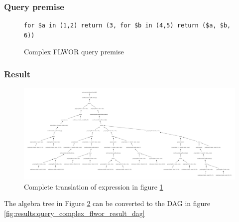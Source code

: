 \subsubsection{Query premise}
\begin{figure}[!htp]
\begin{center}
\begin{Verbatim}
for $a in (1,2) return (3, for $b in (4,5) return ($a, $b, 6))
\end{Verbatim}
  \caption{Complex FLWOR query premise}
  \label{fig:results:query_complex_flwor}
\end{center}
\end{figure}

\subsubsection{Result}
\begin{figure}[!htp]
\begin{center}
  \includegraphics[angle=90,height=0.7\textheight]{img/graphs/td_impl_flwor_complex_xq_relalg} \caption{Complete
  translation of expression in figure
  \ref{fig:results:query_complex_flwor}}
  \label{fig:results:query_complex_flwor_result}
\end{center}
\end{figure}


The algebra tree in Figure \ref{fig:results:query_complex_flwor_result} can
be converted to the DAG in figure
\ref{fig:results:query_complex_flwor_result_dag}

